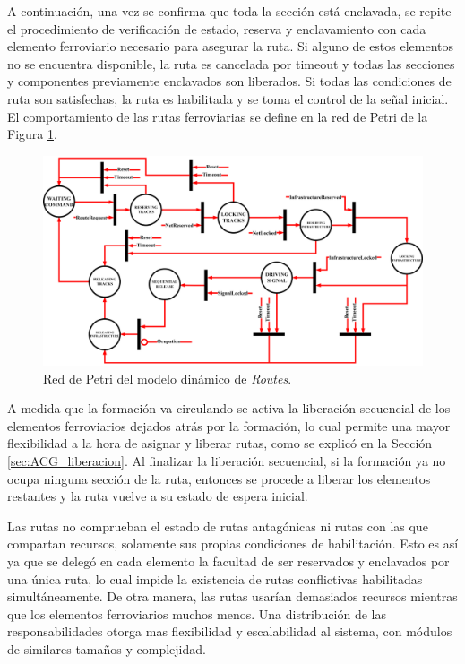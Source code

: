 	A continuación, una vez se confirma que toda la sección está enclavada, se repite el procedimiento de verificación de estado, reserva y enclavamiento con cada elemento ferroviario necesario para asegurar la ruta. Si alguno de estos elementos no se encuentra disponible, la ruta es cancelada por timeout y todas las secciones y componentes previamente enclavados son liberados. Si todas las condiciones de ruta son satisfechas, la ruta es habilitada y se toma el control de la señal inicial. El comportamiento de las rutas ferroviarias se define en la red de Petri de la Figura \ref{fig:RTS_Petri}.
	
	\begin{figure}[H]
		\centering
		\includegraphics[width=1\textwidth]{Figuras/RTS_petri}
		\centering\caption{Red de Petri del modelo dinámico de \textit{Routes}.}
		\label{fig:RTS_Petri}
	\end{figure}
	
	A medida que la formación va circulando se activa la liberación secuencial de los elementos ferroviarios dejados atrás por la formación, lo cual permite una mayor flexibilidad a la hora de asignar y liberar rutas, como se explicó en la Sección \ref{sec:ACG_liberacion}. Al finalizar la liberación secuencial, si la formación ya no ocupa ninguna sección de la ruta, entonces se procede a liberar los elementos restantes y la ruta vuelve a su estado de espera inicial.
	
	Las rutas no comprueban el estado de rutas antagónicas ni rutas con las que compartan recursos, solamente sus propias condiciones de habilitación. Esto es así ya que se delegó en cada elemento la facultad de ser reservados y enclavados por una única ruta, lo cual impide la existencia de rutas conflictivas habilitadas simultáneamente. De otra manera, las rutas usarían demasiados recursos mientras que los elementos ferroviarios muchos menos. Una distribución de las responsabilidades otorga mas flexibilidad y escalabilidad al sistema, con módulos de similares tamaños y complejidad.